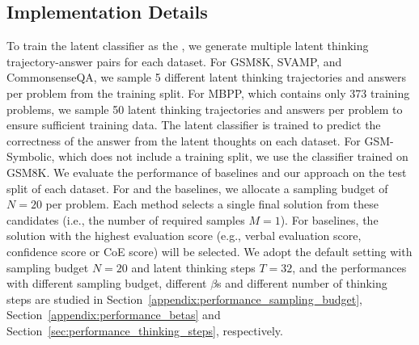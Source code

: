 \documentclass{article} %
\begin{document}
\subsection{Implementation Details}
\label{appendix:implementation_details}
To train the latent classifier as the \LRM, we generate multiple latent thinking trajectory-answer pairs for each dataset. 
%
For GSM8K, SVAMP, and CommonsenseQA, we sample 5 different latent thinking trajectories and answers per problem from the training split. 
%
For MBPP, which contains only 373 training problems, we sample 50 latent thinking trajectories and answers per problem to ensure sufficient training data. 
%
The latent classifier is trained to predict the correctness of the answer from the latent thoughts on each dataset. For GSM-Symbolic, which does not include a training split, we use the classifier trained on GSM8K.
%
We evaluate the performance of baselines and our approach on the test split of each dataset. For \LTO and the baselines, we allocate a sampling budget of $N{=}20$ per problem. Each method selects a single final solution from these candidates (i.e., the number of required samples $M{=}1$). For baselines, the solution with the highest evaluation score (e.g., verbal evaluation score, confidence score or CoE score) will be selected. We adopt the default setting with sampling budget $N{=}20$ and latent thinking steps $T{=}32$, and the performances with different sampling budget, different $\beta$s and different number of thinking steps are studied in Section~\ref{appendix:performance_sampling_budget}, Section~\ref{appendix:performance_betas} and Section~\ref{sec:performance_thinking_steps}, respectively.
\end{document}
